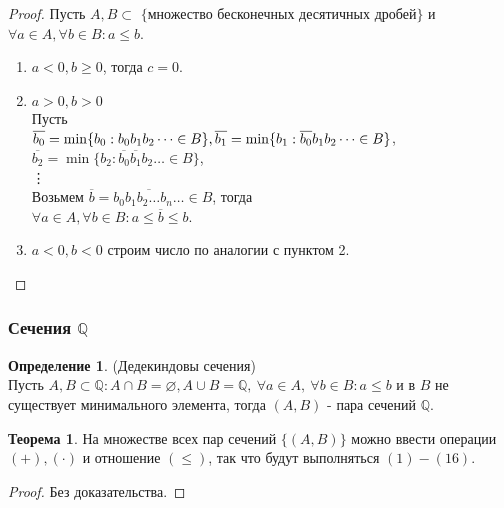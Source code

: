 \documentclass[a4paper, 12pt]{article}
\newcommand{\Q}{\mathbb{Q}}
\renewcommand{\emptyset}{\varnothing}
\theoremstyle{definition}
\newtheorem*{definition}{Определение}
\newtheorem*{theorem}{Теорема}
\begin{document}
        \begin{proof}
            Пусть $A,B\subset$ $\{$множество бесконечных десятичных дробей$\}$ и $\forall a\in A, \forall b\in B: a\leq b$.
            \begin{enumerate}
                \item $a<0, b\geq 0$, тогда $c=0$.
                \item $a>0, b>0$\\
                Пусть\\
                $\overline{b_0}=\min \{b_0: b_0b_1b_2\dots \in B\},\\
                \overline{b_1}=\min \{b_1: \overline{b_0}b_1b_2\dots \in B\}$,\\
                $\overline{b_2}=\min \{b_2: \overline{b_0}\overline{b_1}b_2 \dots \in B\}$,\\
                \vdots \\
                Возьмем $\overline{b}= \overline{b_0b_1b_2\dots b_n \dots}\in B$, тогда\\
                $\forall a\in A, \forall b\in B: a\leq \overline{b}\leq b$.\\
                \item $a<0, b<0$ строим число по аналогии с пунктом 2.
            \end{enumerate}
        \end{proof} 
    \subsubsection{Сечения $\Q$}
        \begin{definition} (Дедекиндовы сечения)\\
            Пусть $A,B\subset \Q: A\cap B = \emptyset, A\cup B=\Q,\ \forall a\in A,\ \forall b\in B: a\leq b$ и в $B$ не существует минимального элемента, тогда $(A,B)$ - пара сечений $\Q$.
        \end{definition} 
        \begin{theorem}
            На множестве всех пар сечений $\{(A,B)\}$ можно ввести операции $(+), (\cdot)$ и отношение $(\leq)$, так что будут выполняться $(1)-(16)$.
        \end{theorem} 
        \begin{proof}
            Без доказательства.
        \end{proof}
\end{document}
